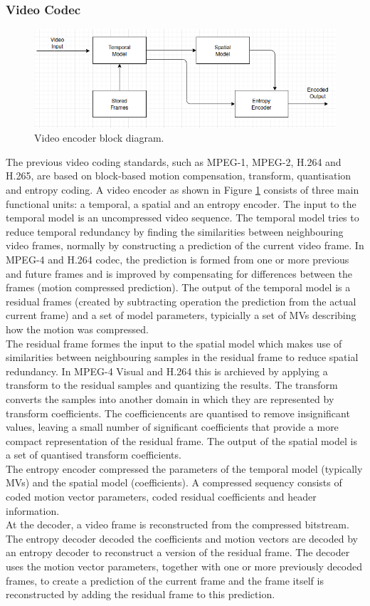\subsubsection{Video Codec}
\begin{figure}
\centering
 \includegraphics[width=0.8\linewidth]{Figures/encoder.png}
 \caption{Video encoder block diagram.}
 \label{fig:encoder}
\end{figure}
The previous video coding standards, such as MPEG-1, MPEG-2, H.264 and H.265, are based on block-based motion compensation, transform, quantisation and entropy coding. A video encoder as shown in Figure \ref{fig:encoder} consists of three main functional units: a temporal, a spatial and an entropy encoder. The input to the temporal model is an uncompressed video sequence. The temporal model tries to reduce temporal redundancy by finding the similarities between neighbouring video frames, normally by constructing a prediction of the current video frame. In MPEG-4 and H.264 codec, the prediction is formed from one or more previous and future frames and is improved by compensating for differences between the frames (motion compressed prediction). The output of the temporal model is a residual frames (created by subtracting operation the prediction from the actual current frame) and a set of model parameters, typicially a set of MVs describing how the motion was compressed. \\
The residual frame formes the input to the spatial model which makes use of similarities between neighbouring samples in the residual frame to reduce spatial redundancy. In MPEG-4 Visual and H.264 this is archieved by applying a transform to the residual samples and quantizing the results. The transform converts the samples into another domain in which they are represented by transform coefficients. The coefficiencents are quantised to remove insignificant values, leaving a small number of significant coefficients that provide a more compact representation of the residual frame. The output of the spatial model is a set of quantised transform coefficients.\\
The entropy encoder compressed the parameters of the temporal model (typically MVs) and the spatial model (coefficients). A compressed sequency consists of coded motion vector parameters, coded residual coefficients and header information.\\
At the decoder, a video frame is reconstructed from the compressed bitstream. The entropy decoder decoded the coefficients and motion vectors are decoded by an entropy decoder to reconstruct a version of the residual frame. The decoder uses the motion vector parameters, together with one or more previously decoded frames, to create a prediction of the current frame and the frame itself is reconstructed by adding the residual frame to this prediction.
